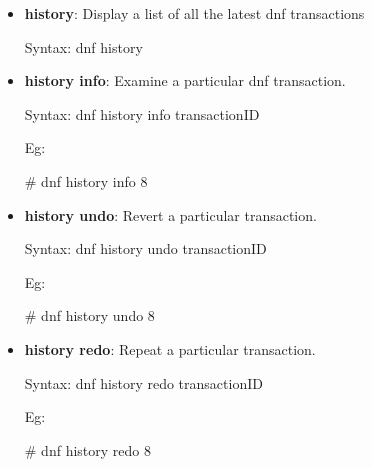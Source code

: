 \begin{flushleft}
\begin{itemize}
		\item \textbf{history}: Display a list of all the latest dnf transactions
		\begin{tcolorbox}[breakable,notitle,boxrule=-0pt,colback=pink,colframe=pink]
			\color{black}
			\font=9pt
			Syntax: dnf history
			\font=4pt
		\end{tcolorbox}
		\bigskip
		\bigskip			

		\item \textbf{history info}: Examine a particular dnf transaction.
		\begin{tcolorbox}[breakable,notitle,boxrule=-0pt,colback=pink,colframe=pink]
			\color{black}
			\font=9pt
			Syntax: dnf history info transactionID
			\font=4pt
		\end{tcolorbox}
		Eg:
		\begin{tcolorbox}[breakable,notitle,boxrule=-0pt,colback=black,colframe=black]
			\color{green}
			\font=9pt
			\# dnf history info 8
			\font=4pt
		\end{tcolorbox}
		\bigskip
		\bigskip			

		\item \textbf{history undo}: Revert a particular transaction.
		\begin{tcolorbox}[breakable,notitle,boxrule=-0pt,colback=pink,colframe=pink]
			\color{black}
			\font=9pt
			Syntax: dnf history undo transactionID
			\font=4pt
		\end{tcolorbox}
		Eg:
		\begin{tcolorbox}[breakable,notitle,boxrule=-0pt,colback=black,colframe=black]
			\color{green}
			\font=9pt
			\# dnf history undo 8
			\font=4pt
		\end{tcolorbox}
		\bigskip
		\bigskip			
		\newpage
		\item \textbf{history redo}: Repeat a particular transaction.
		\begin{tcolorbox}[breakable,notitle,boxrule=-0pt,colback=pink,colframe=pink]
			\color{black}
			\font=9pt
			Syntax: dnf history redo transactionID
			\font=4pt
		\end{tcolorbox}
		Eg:
		\begin{tcolorbox}[breakable,notitle,boxrule=-0pt,colback=black,colframe=black]
			\color{green}
			\font=9pt
			\# dnf history redo 8
			\font=4pt
		\end{tcolorbox}
		\bigskip
		\bigskip		
		

\end{itemize}
\end{flushleft}

